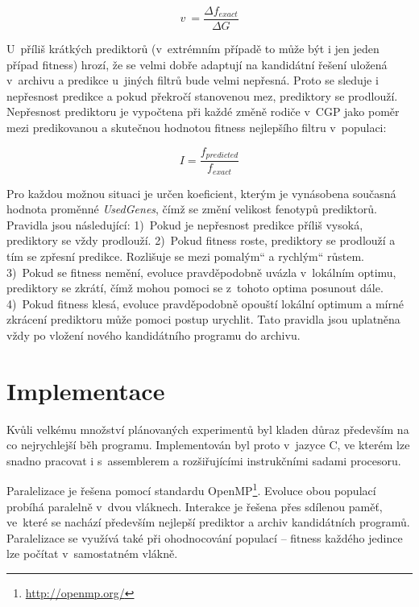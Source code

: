 \documentclass[fleqn,11pt]{ExcelAtFIT} %
\newcommand{\uv}[1]{\quotedblbase #1\textquotedblleft}
\begin{document}
\begin{equation}
    \label{eq:velocity}
    v~= \frac{\Delta{}f_{\mathit{exact}}}{\Delta{}G}
\end{equation}

U~příliš krátkých prediktorů (v~extrémním případě to může být i jen jeden případ fitness) hrozí, že se velmi dobře adaptují na kandidátní řešení uložená v~archivu a predikce u~jiných filtrů bude velmi nepřesná. Proto se sleduje i nepřesnost predikce a pokud překročí stanovenou mez, prediktory se prodlouží. Nepřesnost prediktoru je vypočtena při každé změně rodiče v~CGP jako poměr mezi predikovanou a skutečnou hodnotou fitness nejlepšího filtru v~populaci:

\begin{equation}
    \mathit{I} = \frac{f_{\mathit{predicted}}}{f_{\mathit{exact}}}
\end{equation}

Pro každou možnou situaci je určen koeficient, kterým je vynásobena současná hodnota proměnné \emph{UsedGenes}, čímž se změní velikost fenotypů prediktorů. Pravidla jsou následující: 1)~Pokud je nepřesnost pre\-dikce příliš vysoká, pre\-dik\-to\-ry se vždy prodlouží. 2)~Pokud fitness roste, prediktory se prodlouží a tím se zpřesní predikce. Rozlišuje se mezi \uv{pomalým} a \uv{rychlým} růstem. 3)~Pokud se fitness nemění, evoluce prav\-dě\-po\-dob\-ně uvázla v~lokálním op\-ti\-mu, pre\-dik\-tory se zkrátí, čímž mohou pomoci se z~tohoto op\-ti\-ma po\-su\-nout dále. 4)~Pokud fitness klesá, evoluce prav\-dě\-po\-dob\-ně opouští lokální optimum a mírné zkrácení prediktoru může pomoci postup urychlit. Tato pravidla jsou uplatněna vždy po vložení no\-vé\-ho kandidátního programu do archivu.


\section{Implementace}
\label{sec:Implementation}

Kvůli velkému množství plánovaných experimentů byl kladen důraz především na co nejrychlejší běh programu. Implementován byl proto v~jazyce C, ve kterém lze snadno pracovat i s~assemblerem a rozšiřujícími instrukčními sadami procesoru.

Paralelizace je řešena pomocí standardu OpenMP\footnote{\url{http://openmp.org/}}. Evoluce obou populací probíhá paralelně v~dvou vlák\-nech. Interakce je řešena přes sdílenou paměť, ve~které se nachází především nejlepší prediktor a archiv kandidátních programů. Paralelizace se využívá také při ohodnocování populací -- fitness každého je\-din\-ce lze počítat v~samostatném vlákně.
\end{document}
